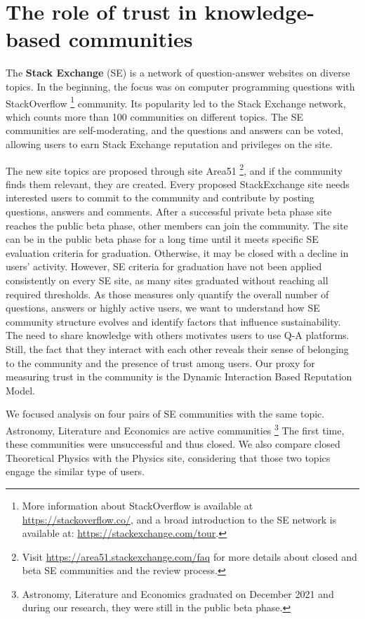 
\chapter{The role of trust in knowledge-based communities} %
\label{Ch:Trust}

The \textbf{Stack Exchange} (SE) is a network of question-answer websites on diverse topics. In the beginning, the focus was on computer programming questions with StackOverflow \footnote{
	More information about StackOverflow is available at \url{https://stackoverflow.co/}, and a broad introduction to the SE network is available at: \url{https://stackexchange.com/tour}. 
}  community. Its popularity led to the Stack Exchange network, which counts more than 100 communities on different topics. The SE communities are self-moderating, and the questions and answers can be voted, allowing users to earn Stack Exchange reputation and privileges on the site. 

The new site topics are proposed through site Area51 \footnote{Visit \url{https://area51.stackexchange.com/faq} for more details about closed and beta SE communities and the review process.}, and if the community finds them relevant, they are created. Every proposed  StackExchange site needs interested users to commit to the community and contribute by posting questions, answers and comments. After a successful private beta phase site reaches the public beta phase, other members can join the community. The site can be in the public beta phase for a long time until it meets specific SE evaluation criteria for graduation. Otherwise, it may be closed with a decline in users’ activity. However, SE criteria for graduation have not been applied consistently on every SE site, as many sites graduated without reaching all required thresholds. As those measures only quantify the overall number of questions, answers or highly active users, we want to understand how SE community structure evolves and identify factors that influence sustainability. The need to share knowledge with others motivates users to use Q-A platforms. Still, the fact that they interact with each other reveals their sense of belonging to the community and the presence of trust among users. Our proxy for measuring trust in the community is the Dynamic Interaction Based Reputation Model.

We focused analysis on four pairs of SE communities with the same topic. Astronomy, Literature and Economics are active communities \footnote{Astronomy, Literature and Economics graduated on December 2021 and during our research, they were still in the public beta phase.} The first time, these communities were unsuccessful and thus closed. We also compare closed Theoretical Physics with the Physics site, considering that those two topics engage the similar type of users. 

